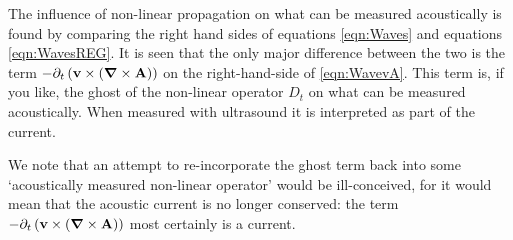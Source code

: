 \documentclass[10pt, fleqn,final,showtrims,oldfontcommands]{article} %
\newcommand{\eqnref}[1]{\ref{eqn:#1}}
\newcommand{\lr}[1]{\left( #1 \right)}
\renewcommand{\d}{\partial}
\newcommand{\del}{\nabla}
\newcommand{\vdel}{ \mbox{\boldmath $\del$}}
\newcommand{\dt}{{\d_t}}
\newcommand{\Dt}{D_t}
\newcommand{\vA}{\textbf{A}}
\newcommand{\vv}{\textbf{v}}
\begin{document}
The influence of non-linear propagation on what can be measured acoustically is found by comparing the right hand sides of equations \eqnref{Waves} and equations \eqnref{WavesREG}.
It is seen that the only major difference between the two is the term $- \dt \lr{ \vv \times \lr{\vdel \times \vA}}$ on the right-hand-side of \eqnref{WavevA}.
This term is, if you like, the ghost of the non-linear operator $\Dt$ on what can be measured acoustically.
When measured with ultrasound it is interpreted  as part of the current.

We note that an attempt to re-incorporate the ghost  term back into some `acoustically measured non-linear operator' would be ill-conceived, 
for it would mean that the acoustic current is no longer conserved:
the term $- \dt \lr{ \vv \times \lr{\vdel \times \vA}}$ most certainly is a current.










\end{document}
